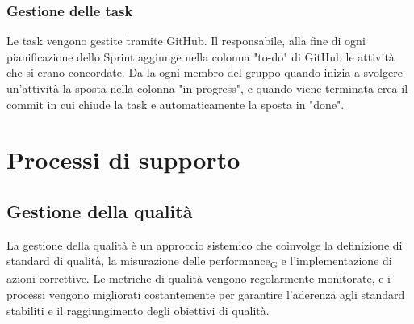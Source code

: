 \documentclass{article}
\begin{document}
\subsubsection{Gestione delle task}
Le task vengono gestite tramite GitHub. Il responsabile, alla fine di ogni pianificazione dello Sprint aggiunge nella colonna "to-do" di GitHub le attività che si erano concordate. Da la ogni membro del gruppo quando inizia a svolgere un'attività la sposta nella colonna "in progress", e quando viene terminata crea il commit in cui chiude la task e automaticamente la sposta in "done".  

\section{Processi di supporto}

\subsection{Gestione della qualità}
La gestione della qualità è un approccio sistemico che coinvolge la definizione di standard di qualità, la misurazione delle performance\textsubscript{G} e l'implementazione di azioni correttive. Le metriche di qualità vengono regolarmente monitorate, e i processi vengono migliorati costantemente per garantire l'aderenza agli standard stabiliti e il raggiungimento degli obiettivi di qualità.
\end{document}
